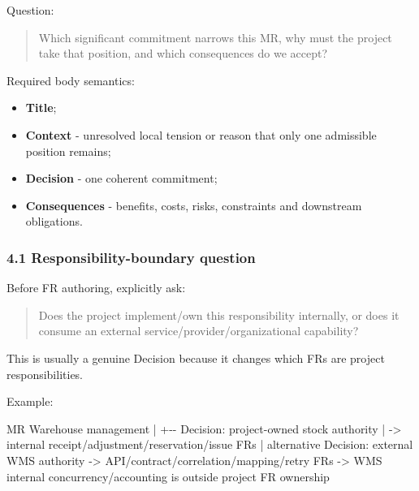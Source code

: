 \documentclass[
  10pt,
]{article}
\newenvironment{Shaded}{}{}
\newcommand{\NormalTok}[1]{#1}
\providecommand{\tightlist}{%
  \setlength{\itemsep}{0pt}\setlength{\parskip}{0pt}}
\begin{document}
Question:

\begin{quote}
Which significant commitment narrows this MR, why must the project take
that position, and which consequences do we accept?
\end{quote}

Required body semantics:

\begin{itemize}
\tightlist
\item
  \textbf{Title};
\item
  \textbf{Context} - unresolved local tension or reason that only one
  admissible position remains;
\item
  \textbf{Decision} - one coherent commitment;
\item
  \textbf{Consequences} - benefits, costs, risks, constraints and
  downstream obligations.
\end{itemize}

\subsubsection{4.1 Responsibility-boundary
question}\label{41-responsibility-boundary-question}

Before FR authoring, explicitly ask:

\begin{quote}
Does the project implement/own this responsibility internally, or does
it consume an external service/provider/organizational capability?
\end{quote}

This is usually a genuine Decision because it changes which FRs are
project responsibilities.

Example:

\begin{Shaded}
\begin{Highlighting}[]
\NormalTok{MR Warehouse management}
\NormalTok{   |}
\NormalTok{   +{-}{-} Decision: project{-}owned stock authority}
\NormalTok{   |      {-}\textgreater{} internal receipt/adjustment/reservation/issue FRs}
\NormalTok{   |}
\NormalTok{   \textasciigrave{}{-}{-} alternative Decision: external WMS authority}
\NormalTok{          {-}\textgreater{} API/contract/correlation/mapping/retry FRs}
\NormalTok{          {-}\textgreater{} WMS internal concurrency/accounting is outside project FR ownership}
\end{Highlighting}
\end{Shaded}
\end{document}
